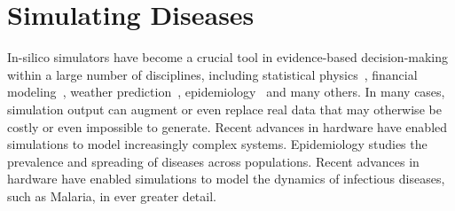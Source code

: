 \documentclass{article}
\begin{document}


 \section{Simulating Diseases}
 \label{sec:background}


In-silico simulators have become a crucial tool in evidence-based decision-making within a large number of disciplines, including statistical physics~\cite{landau_binder_2014}, financial modeling~\cite{jackel2002monte},
weather prediction~\cite{evensen1994sequential}, epidemiology~\cite{smith2008towards} and many others.
In many cases, simulation output can augment or even replace real data that may otherwise be costly or even impossible to generate.
Recent advances in hardware have enabled simulations to model increasingly complex systems.
Epidemiology studies the prevalence and spreading of diseases across populations. Recent advances in hardware have enabled simulations to model the dynamics of infectious diseases, such as Malaria, in ever greater detail.
\end{document}
